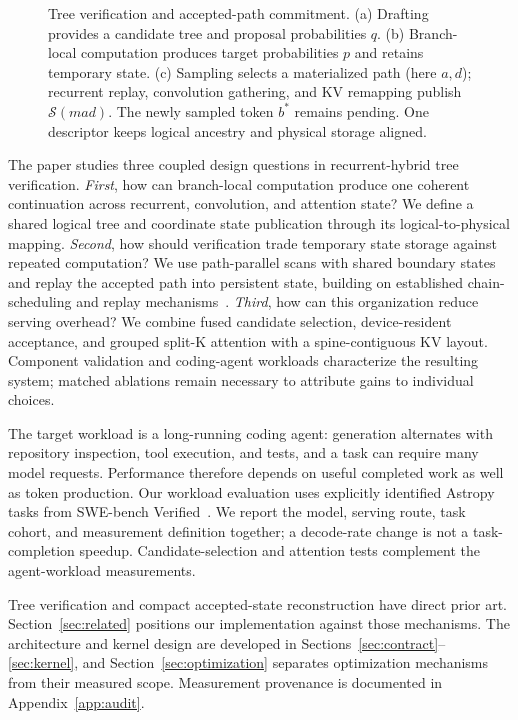 \documentclass[conference]{IEEEtran}
\begin{document}
\begin{figure}[t]
\centering
\resizebox{\textwidth}{!}{}
\caption{Tree verification and accepted-path commitment. (a) Drafting provides a candidate tree and proposal probabilities $q$. (b) Branch-local computation produces target probabilities $p$ and retains temporary state. (c) Sampling selects a materialized path (here $a,d$); recurrent replay, convolution gathering, and KV remapping publish $\mathcal{S}(mad)$. The newly sampled token $b^*$ remains pending. One descriptor keeps logical ancestry and physical storage aligned.}
\label{fig:pipeline}
\end{figure}

The paper studies three coupled design questions in recurrent-hybrid tree verification. \textit{First}, how can branch-local computation produce one coherent continuation across recurrent, convolution, and attention state? We define a shared logical tree and coordinate state publication through its logical-to-physical mapping. \textit{Second}, how should verification trade temporary state storage against repeated computation? We use path-parallel scans with shared boundary states and replay the accepted path into persistent state, building on established chain-scheduling and replay mechanisms~\cite{wang2026specla,oda2026marginals}. \textit{Third}, how can this organization reduce serving overhead? We combine fused candidate selection, device-resident acceptance, and grouped split-K attention with a spine-contiguous KV layout. Component validation and coding-agent workloads characterize the resulting system; matched ablations remain necessary to attribute gains to individual choices.

The target workload is a long-running coding agent: generation alternates with repository inspection, tool execution, and tests, and a task can require many model requests. Performance therefore depends on useful completed work as well as token production. Our workload evaluation uses explicitly identified Astropy tasks from SWE-bench Verified~\cite{jimenez2024swe}. We report the model, serving route, task cohort, and measurement definition together; a decode-rate change is not a task-completion speedup. Candidate-selection and attention tests complement the agent-workload measurements.

Tree verification and compact accepted-state reconstruction have direct prior art. Section~\ref{sec:related} positions our implementation against those mechanisms. The architecture and kernel design are developed in Sections~\ref{sec:contract}--\ref{sec:kernel}, and Section~\ref{sec:optimization} separates optimization mechanisms from their measured scope. Measurement provenance is documented in Appendix~\ref{app:audit}.
\end{document}
